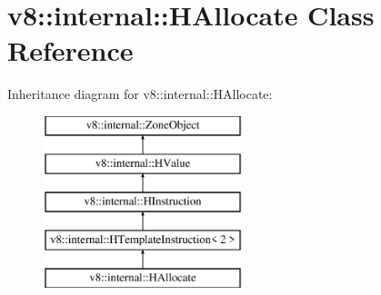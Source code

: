 \hypertarget{classv8_1_1internal_1_1_h_allocate}{}\section{v8\+:\+:internal\+:\+:H\+Allocate Class Reference}
\label{classv8_1_1internal_1_1_h_allocate}
Inheritance diagram for v8\+:\+:internal\+:\+:H\+Allocate\+:\begin{figure}[H]
\begin{center}
\leavevmode
\includegraphics[height=5.000000cm]{classv8_1_1internal_1_1_h_allocate}
\end{center}
\end{figure}
